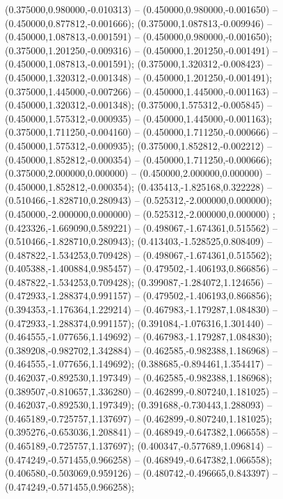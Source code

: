  (0.375000,0.980000,-0.010313) -- (0.450000,0.980000,-0.001650) -- (0.450000,0.877812,-0.001666);
 (0.375000,1.087813,-0.009946) -- (0.450000,1.087813,-0.001591) -- (0.450000,0.980000,-0.001650);
 (0.375000,1.201250,-0.009316) -- (0.450000,1.201250,-0.001491) -- (0.450000,1.087813,-0.001591);
 (0.375000,1.320312,-0.008423) -- (0.450000,1.320312,-0.001348) -- (0.450000,1.201250,-0.001491);
 (0.375000,1.445000,-0.007266) -- (0.450000,1.445000,-0.001163) -- (0.450000,1.320312,-0.001348);
 (0.375000,1.575312,-0.005845) -- (0.450000,1.575312,-0.000935) -- (0.450000,1.445000,-0.001163);
 (0.375000,1.711250,-0.004160) -- (0.450000,1.711250,-0.000666) -- (0.450000,1.575312,-0.000935);
 (0.375000,1.852812,-0.002212) -- (0.450000,1.852812,-0.000354) -- (0.450000,1.711250,-0.000666);
 (0.375000,2.000000,0.000000) -- (0.450000,2.000000,0.000000) -- (0.450000,1.852812,-0.000354);
 (0.435413,-1.825168,0.322228) -- (0.510466,-1.828710,0.280943) -- (0.525312,-2.000000,0.000000);
 (0.450000,-2.000000,0.000000) -- (0.525312,-2.000000,0.000000) ;
 (0.423326,-1.669090,0.589221) -- (0.498067,-1.674361,0.515562) -- (0.510466,-1.828710,0.280943);
 (0.413403,-1.528525,0.808409) -- (0.487822,-1.534253,0.709428) -- (0.498067,-1.674361,0.515562);
 (0.405388,-1.400884,0.985457) -- (0.479502,-1.406193,0.866856) -- (0.487822,-1.534253,0.709428);
 (0.399087,-1.284072,1.124656) -- (0.472933,-1.288374,0.991157) -- (0.479502,-1.406193,0.866856);
 (0.394353,-1.176364,1.229214) -- (0.467983,-1.179287,1.084830) -- (0.472933,-1.288374,0.991157);
 (0.391084,-1.076316,1.301440) -- (0.464555,-1.077656,1.149692) -- (0.467983,-1.179287,1.084830);
 (0.389208,-0.982702,1.342884) -- (0.462585,-0.982388,1.186968) -- (0.464555,-1.077656,1.149692);
 (0.388685,-0.894461,1.354417) -- (0.462037,-0.892530,1.197349) -- (0.462585,-0.982388,1.186968);
 (0.389507,-0.810657,1.336280) -- (0.462899,-0.807240,1.181025) -- (0.462037,-0.892530,1.197349);
 (0.391688,-0.730443,1.288093) -- (0.465189,-0.725757,1.137697) -- (0.462899,-0.807240,1.181025);
 (0.395276,-0.653036,1.208841) -- (0.468949,-0.647382,1.066558) -- (0.465189,-0.725757,1.137697);
 (0.400347,-0.577689,1.096814) -- (0.474249,-0.571455,0.966258) -- (0.468949,-0.647382,1.066558);
 (0.406580,-0.503069,0.959126) -- (0.480742,-0.496665,0.843397) -- (0.474249,-0.571455,0.966258);
